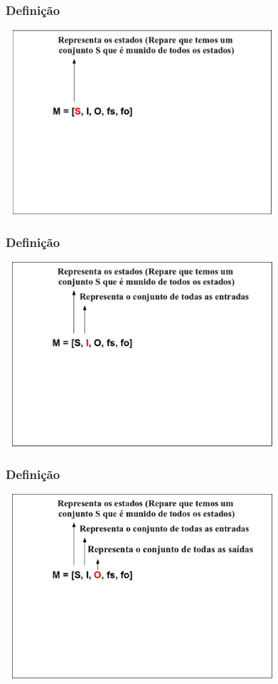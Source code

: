 \documentclass{beamer}
\begin{document}
  \begin{frame}
   \frametitle{Definição}
       \includegraphics[height=2.7in, width=4in]{entendendo_definicao_2.png}
  \end{frame}

  \begin{frame}
   \frametitle{Definição}
       \includegraphics[height=2.7in, width=4in]{entendendo_definicao_3.png}
  \end{frame}

  \begin{frame}
   \frametitle{Definição}
       \includegraphics[height=2.7in, width=4in]{entendendo_definicao_4.png}
  \end{frame}
\end{document}
